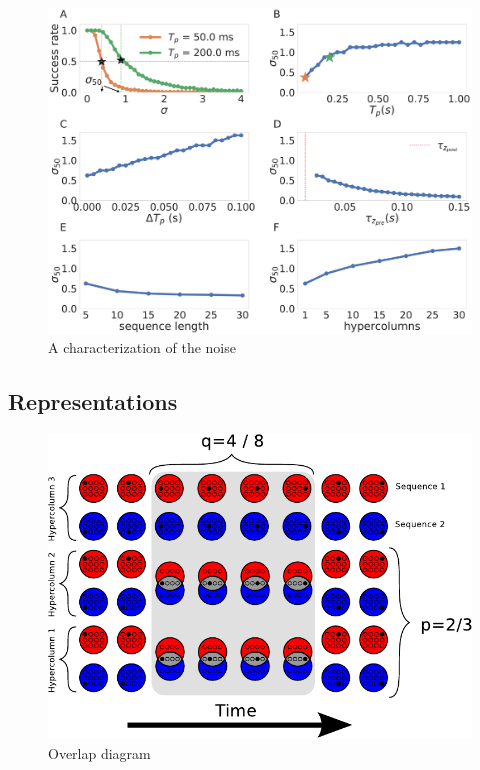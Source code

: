 \documentclass[10pt,a4paper]{article}
\begin{document}
\begin{figure}[H]
\centering
\includegraphics[scale=0.20]{noise_robustness.pdf}
\caption{A characterization of the noise}
\label{fig:robustness}
\end{figure}

\subsection{Representations}
\begin{figure}[H]
\centering
\includegraphics[scale=0.90]{overlap_diagram.pdf}
\caption{Overlap diagram}
\label{fig:representation_scheme}
\end{figure}
\end{document}
